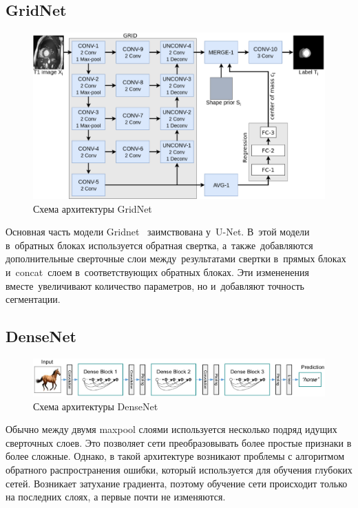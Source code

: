 \subsection{GridNet}

\begin{figure}[ht]
  \includegraphics[width=\textwidth,keepratio]{img/gridnet}
  \caption{Схема архитектуры GridNet}
\end{figure}

Основная часть модели Gridnet~\cite{gridnet} заимствована у~U-Net. 
В~этой модели в~обратных блоках используется обратная свертка, 
а~также~добавляются дополнительные сверточные слои между~результатами 
свертки в~прямых блоках и~concat~слоем в~соответствующих обратных блоках. 
Эти измененения вместе~увеличивают количество параметров, но и~добавляют
точность сегментации.

\subsection{DenseNet}

\begin{figure}[ht]
  \includegraphics[width=\textwidth,keepratio]{img/densenet}
  \caption{Схема архитектуры DenseNet}
\end{figure}

Обычно между двумя maxpool слоями используется несколько подряд идущих сверточных слоев. Это позволяет сети преобразовывать более простые признаки в более сложные. Однако, в такой архитектуре возникают проблемы с алгоритмом обратного распространения ошибки, который используется для обучения глубоких сетей. Возникает затухание градиента, поэтому обучение сети происходит только на последних слоях, а первые почти не изменяются. 

